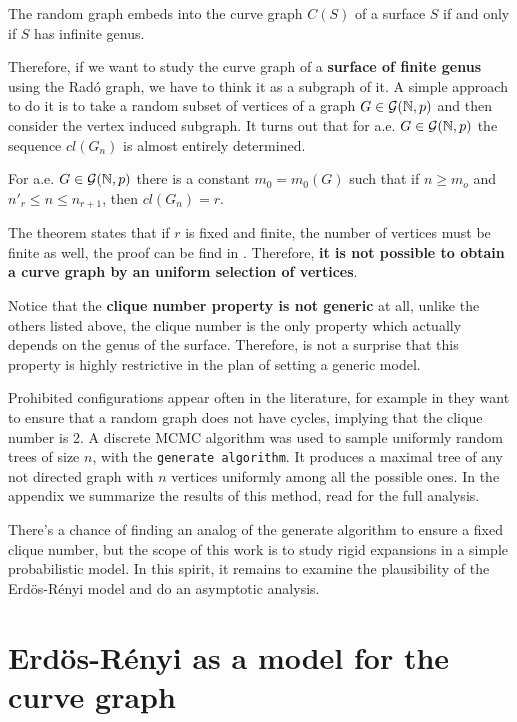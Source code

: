 \begin{theorem}
The random graph embeds into the curve graph $C(S)$ of a surface $S$ if and only if $S$ has infinite genus.
\end{theorem}

Therefore, if we want to study the curve graph of a \textbf{surface of finite genus} using the Radó graph, we have to think it as a subgraph of it. A simple approach to do it is to take a random subset of vertices of a graph $G\in \mathcal{G}(\mathbb{N}, p)$ and then consider the vertex induced subgraph. It turns out that for a.e. $G\in \mathcal{G}(\mathbb{N}, p)$ the sequence $cl(G_n)$ is almost entirely determined.

\begin{theorem}
For a.e. $G \in \mathcal{G}(\mathbb{N},p)$ there is a constant $m_0 = m_{0}(G)$ such that if $n \geq m_o$ and $n'_{r} \leq n \leq n_{r+1}$, then $cl(G_{n}) = r$.
\end{theorem}

The theorem states that if $r$ is fixed and finite, the number of vertices must be finite as well, the proof can be find in \cite[Bollobás p.~284]{Bollobas}. Therefore, \textbf{it is not possible to obtain a curve graph by an uniform selection of vertices}.

Notice that the \textbf{clique number property is not generic} at all, unlike the others listed above, the clique number is the only property which actually depends on the genus of the surface. Therefore, is not a surprise that this property is highly restrictive in the plan of setting a generic model.

Prohibited configurations appear often in the literature, for example in \cite[Alcazar 15]{Alcazar15} they want to ensure that a random graph does not have cycles, implying that the clique number is 2. A discrete MCMC algorithm was used to sample uniformly random trees of size $n$, with the \texttt{generate algorithm}. It produces a maximal tree of any not directed graph with $n$ vertices uniformly among all the possible ones. In the appendix we summarize the results of this method, read \cite[Broder 89]{Broder89} for the full analysis.

There's a chance of finding an analog of the generate algorithm to ensure a fixed clique number, but the scope of this work is to study rigid expansions in a simple probabilistic model. In this spirit, it remains to examine the plausibility of the Erdös-Rényi model and do an asymptotic analysis.

\section{Erdös-Rényi as a model for the curve graph}

